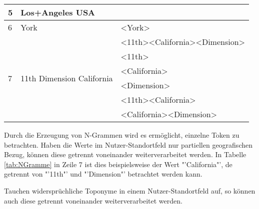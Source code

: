 \begin{table}[h]
\begin{tabular}{|l|l|l|}
					5                               & Los+Angeles USA                             &                                                                                          \\ \hline \hline
					6                               & York                                        & \textless York\textgreater                                                                \\ \hline \hline
					\multirow{6}{*}{7}              & \multirow{6}{*}{11th Dimension California}  & \textless 11th\textgreater\textless California\textgreater\textless Dimension\textgreater \\ \cline{3-3} 
					                                &                                             & \textless 11th\textgreater                                                                \\ \cline{3-3} 
					                                &                                             & \textless California\textgreater                                                         \\ \cline{3-3} 
					                                &                                             & \textless Dimension\textgreater                                                          \\ \cline{3-3} 
					                                &                                             & \textless 11th\textgreater\textless California\textgreater                                 \\ \cline{3-3} 
					                                &                                             & \textless California\textgreater\textless Dimension\textgreater                           \\ \hline
					\end{tabular}
					\end{table}

				Durch die Erzeugung von N-Grammen wird es ermöglicht, einzelne Token zu betrachten.
				Haben die Werte im Nutzer-Standortfeld nur partiellen geografischen Bezug, können diese getrennt voneinander weiterverarbeitet werden.
				In Tabelle \ref{tab:NGramme} in Zeile 7 ist dies beispielsweise der Wert "'California"', de getrennt von "'11th"' und "'Dimension"' betrachtet werden kann. 
				
				Tauchen widersprüchliche Toponyme in einem Nutzer-Standortfeld auf, so können auch diese getrennt voneinander weiterverarbeitet werden.

